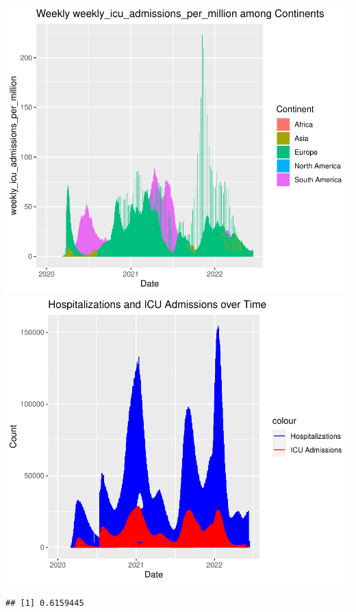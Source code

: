 \documentclass[11pt,preprint, authoryear]{elsarticle}
\numberwithin{equation}{section}
\numberwithin{figure}{section}
\numberwithin{table}{section}
\begin{document}
\includegraphics{Q1_files/figure-latex/unnamed-chunk-3-1.pdf}
\includegraphics{Q1_files/figure-latex/unnamed-chunk-3-2.pdf}

\begin{verbatim}
## [1] 0.6159445
\end{verbatim}
\end{document}
